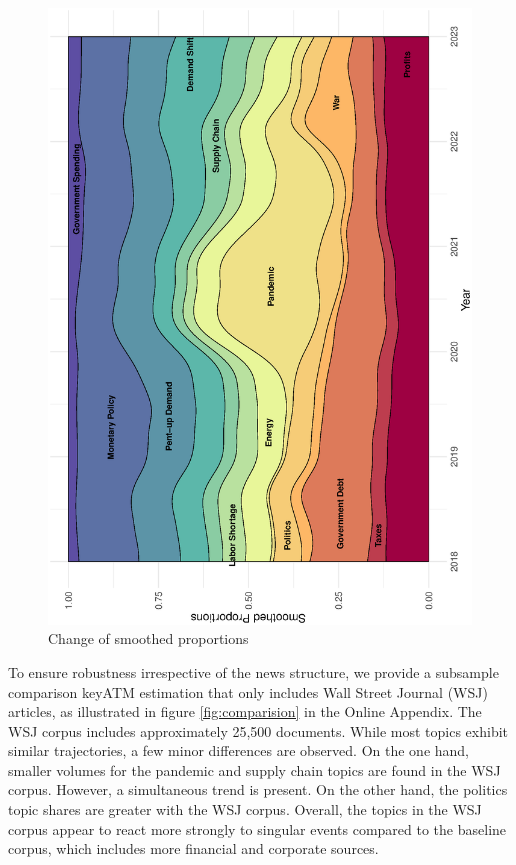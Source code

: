 \begin{figure}[H]
	\centering
	\includegraphics[width=0.65\linewidth, angle = 270]{figures/narratives_all.eps}
	\caption{Change of smoothed proportions}
	\label{fig:narr_all}
\end{figure}

To ensure robustness irrespective of the news structure, we provide a subsample comparison \textsf{keyATM} estimation that only includes Wall Street Journal (WSJ) articles, as illustrated in figure \ref{fig:comparision} in the Online Appendix. The WSJ corpus includes approximately 25,500 documents. While most topics exhibit similar trajectories, a few minor differences are observed. On the one hand, smaller volumes for the pandemic and supply chain topics are found in the WSJ corpus. However, a simultaneous trend is present. On the other hand, the politics topic shares are greater with the WSJ corpus. Overall, the topics in the WSJ corpus appear to react more strongly to singular events compared to the baseline corpus, which includes more financial and corporate sources.

